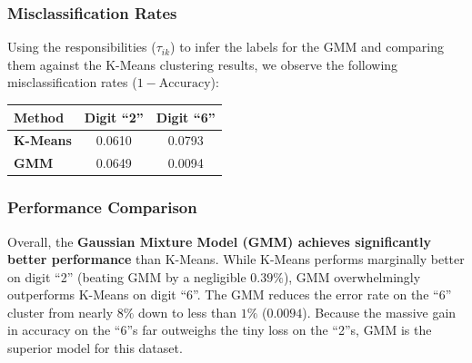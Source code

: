 \documentclass[twoside, 10pt]{article}
\begin{document}
\subsubsection{Misclassification Rates}
Using the responsibilities ($\tau_{ik}$) to infer the labels for the GMM and comparing them against the K-Means clustering results, we observe the following misclassification rates ($1 - \text{Accuracy}$):
\begin{table}[h]
    \centering
    \renewcommand{\arraystretch}{1.2}
    \begin{tabular}{l c c}
        \hline
        \textbf{Method} & \textbf{Digit ``2''} & \textbf{Digit ``6''} \\
        \hline
        \textbf{K-Means} & 0.0610 & 0.0793 \\
        \textbf{GMM} & 0.0649 & 0.0094 \\
        \hline
    \end{tabular}
\end{table}

\subsubsection{Performance Comparison}
Overall, the \textbf{Gaussian Mixture Model (GMM) achieves significantly better performance} than K-Means. 
While K-Means performs marginally better on digit ``2'' (beating GMM by a negligible $0.39\%$), GMM overwhelmingly outperforms K-Means on digit ``6''. The GMM reduces the error rate on the ``6'' cluster from nearly $8\%$ down to less than $1\%$ ($0.0094$). Because the massive gain in accuracy on the ``6''s far outweighs the tiny loss on the ``2''s, GMM is the superior model for this dataset.
\end{document}
